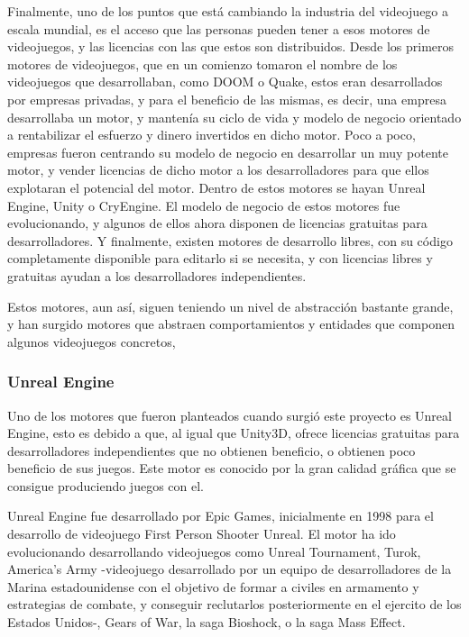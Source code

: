 Finalmente, uno de los puntos que está cambiando la industria del videojuego a escala mundial, es el acceso que las personas pueden tener a esos motores de videojuegos, y las licencias con las que estos son distribuidos. Desde los primeros motores de videojuegos, que en un comienzo tomaron el nombre de los videojuegos que desarrollaban, como DOOM o Quake, estos eran desarrollados por empresas privadas, y para el beneficio de las mismas, es decir, una empresa desarrollaba un motor, y mantenía su ciclo de vida y modelo de negocio orientado a rentabilizar el esfuerzo y dinero invertidos en dicho motor. Poco a poco, empresas fueron centrando su modelo de negocio en desarrollar un muy potente motor, y vender licencias de dicho motor a los desarrolladores para que ellos explotaran el potencial del motor. Dentro de estos motores se hayan Unreal Engine, Unity o CryEngine. El modelo de negocio de estos motores fue evolucionando, y algunos de ellos ahora disponen de licencias gratuitas para desarrolladores. Y finalmente, existen motores de desarrollo libres, con su código completamente disponible para editarlo si se necesita, y con licencias libres y gratuitas ayudan a los desarrolladores independientes.

Estos motores, aun así, siguen teniendo un nivel de abstracción bastante grande, y han surgido motores que abstraen comportamientos y entidades que componen algunos videojuegos concretos, 

\subsubsection{Unreal Engine}

Uno de los motores que fueron planteados cuando surgió este proyecto es Unreal Engine, esto es debido a que, al igual que Unity3D, ofrece licencias gratuitas para desarrolladores independientes que no obtienen beneficio, o obtienen poco beneficio de sus juegos. Este motor es conocido por la gran calidad gráfica que se consigue produciendo juegos con el.

Unreal Engine fue desarrollado por Epic Games, inicialmente en 1998 para el desarrollo de videojuego First Person Shooter Unreal. El motor ha ido evolucionando desarrollando videojuegos como Unreal Tournament, Turok, America's Army -videojuego desarrollado por un equipo de desarrolladores de la Marina estadounidense con el objetivo de formar a civiles en armamento y estrategias de combate, y conseguir reclutarlos posteriormente en el ejercito de los Estados Unidos-, Gears of War, la saga Bioshock, o la saga Mass Effect. 

